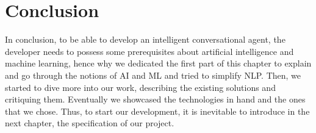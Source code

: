 \section{Conclusion}
In conclusion, to be able to develop an intelligent conversational agent, the developer needs to possess some prerequisites about artificial intelligence and machine learning, hence why we dedicated the first part of this chapter to explain and go through the notions of AI and ML and tried to simplify NLP.
Then, we started to dive more into our work, describing the existing solutions and critiquing them. Eventually we showcased the technologies in hand and the ones that we chose. Thus, to start our development, it is inevitable to introduce in the next chapter, the specification of our project. 
